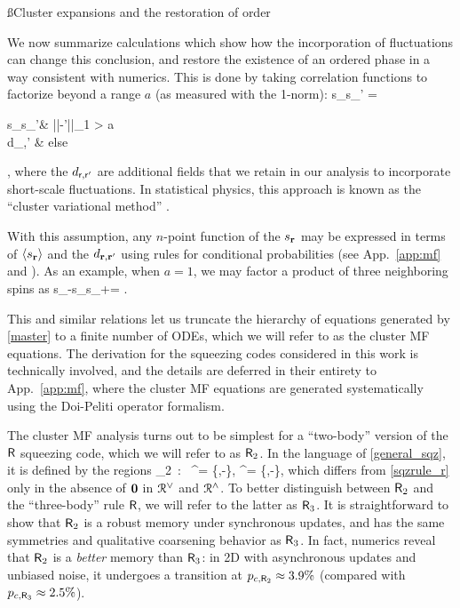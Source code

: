 \documentclass[pra,aps,twocolumn,groupedaddress,superscriptaddress,nofootinbib,preprintnumbers]{revtex4-2}
\begin{document}
	
	\ss{Cluster expansions and the restoration of order}
	
	We now summarize calculations which show how the incorporation of fluctuations can change this conclusion, and restore the existence of an ordered phase in a way consistent with numerics. This is done by taking correlation functions to factorize beyond a range $a$ (as measured with the 1-norm): 
	\be \label{nntrunc} \lan s_\bfr s_{\bfr'} \ran = \begin{dcases} \lan s_\bfr\ran\lan s_{\bfr'}\ran & ||\bfr-\bfr'||_1 > a \\ 
		d_{\bfr,\bfr'}  & {\rm else} \end{dcases},\ee 
	where the $d_{\mathsf{r},\mathsf{r}'}$ are additional fields that we retain in our analysis to incorporate short-scale fluctuations. In statistical physics, this approach is known as the ``cluster variational method'' \cite{kikuchi1951theory,pelizzola2005cluster}.
	
	With this assumption, any $n$-point function of the $s_{\mathbf{r}}$ may be expressed in terms of $\langle s_{\mathbf{r}}\rangle$ and the $d_{\mathbf{r},\mathbf{r}'}$ using rules for conditional probabilities (see App.~\ref{app:mf} and \cite{pelizzola2005cluster}). As an example, when $a=1$, we may factor a product of three neighboring spins as 
	\be \lan s_{\bfr-\uvx}s_\bfr s_{\bfr+\uvx}\ran =  . \ee 
	
	This and similar relations let us truncate the hierarchy of equations generated by \eqref{master} to a finite number of ODEs, which we will refer to as the cluster MF equations. The derivation for the squeezing codes considered in this work is technically involved, and the details are deferred in their entirety to App.~\ref{app:mf}, where the cluster MF equations are generated systematically using the Doi-Peliti operator formalism. 
	
	The cluster MF analysis turns out to be simplest for a ``two-body'' version of the $\mathsf{R}$ squeezing code, which we will refer to as $\mathsf{R}_2$. In the language of \eqref{general_sqz}, it is defined by the regions 
	\bea \label{sqzrule_r2} \sfR_2\, : \, \mcr^\vee = \{\uvx,-\uvx\}, \qq \mcr^\wedge = \{\uvy,-\uvy\},\eea
	which differs from \eqref{sqzrule_r} only in the absence of ${\mathbf{0}}$ in $\mathcal{R}^\vee$ and $\mathcal{R}^\wedge$. To better distinguish between $\mathsf{R}_2$ and the ``three-body'' rule $\mathsf{R}$, we will refer to the latter as $\mathsf{R}_3$. It is straightforward to show that $\mathsf{R}_2$ is a robust memory under synchronous updates, and has the same symmetries and qualitative coarsening behavior as $\mathsf{R}_3$. In fact, numerics reveal that $\mathsf{R}_2$ is a {\it better} memory than $\mathsf{R}_3$: in 2D with asynchronous updates and unbiased noise, it undergoes a transition at $p_{c,\mathsf{R}_2} \approx 3.9\%$ (compared with $p_{c,\mathsf{R}_3} \approx 2.5\%$). 
	
\end{document}

